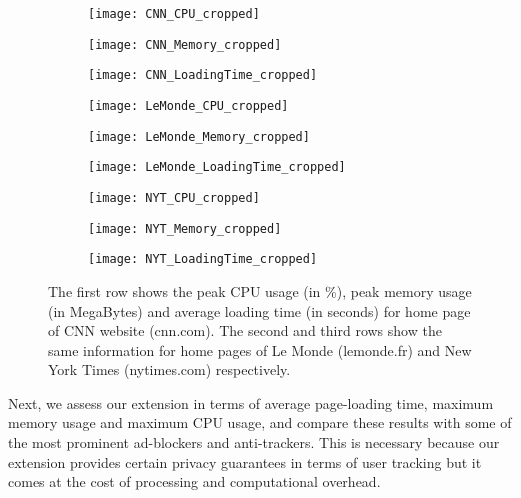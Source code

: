 \documentclass[conference]{IEEEtran}
\begin{document}
\begin{figure*}
\begin{subfigure}[b]{0.33\textwidth}
  \texttt{[image: CNN\_CPU\_cropped]}
\end{subfigure}\begin{subfigure}[b]{0.33\textwidth}
  \texttt{[image: CNN\_Memory\_cropped]}
\end{subfigure}
\begin{subfigure}[b]{0.33\textwidth}
  \texttt{[image: CNN\_LoadingTime\_cropped]}
\end{subfigure}

\begin{subfigure}[b]{0.33\textwidth}
  \texttt{[image: LeMonde\_CPU\_cropped]}
\end{subfigure}\begin{subfigure}[b]{0.33\textwidth}
  \texttt{[image: LeMonde\_Memory\_cropped]}
\end{subfigure}
\begin{subfigure}[b]{0.33\textwidth}
  \texttt{[image: LeMonde\_LoadingTime\_cropped]}
\end{subfigure}


\begin{subfigure}[b]{0.33\textwidth}
  \texttt{[image: NYT\_CPU\_cropped]}
\end{subfigure}\begin{subfigure}[b]{0.33\textwidth}
  \texttt{[image: NYT\_Memory\_cropped]}
\end{subfigure}
\begin{subfigure}[b]{0.33\textwidth}
  \texttt{[image: NYT\_LoadingTime\_cropped]}
\end{subfigure}


\caption{The first row shows the peak CPU usage (in \%), peak memory usage (in MegaBytes) and average loading time (in seconds) for home page of CNN website (cnn.com). 
The second and third rows show the same information for home pages of Le Monde (lemonde.fr) and New York Times (nytimes.com) respectively.}
\label{fig:performance_benchmark}
\end{figure*}



Next, we assess our extension in terms of average page-loading time, 
maximum memory usage and maximum CPU usage, and compare these results with some of the most prominent ad-blockers and anti-trackers. 
This is necessary because our extension provides certain privacy guarantees in terms of user tracking but it comes at the cost of processing and computational overhead. 
\end{document}
